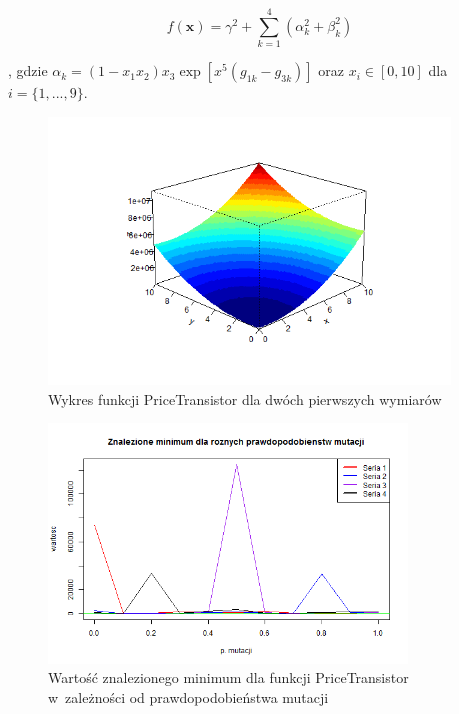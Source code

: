 \documentclass[11pt, a4paper]{article}
\begin{document}
\begin{equation}\label{eq:pricetransistor}
f(\boldsymbol{x}) = \gamma^2 + \sum_{k=1}^{4} ( \alpha_k^2 + \beta_k^2 )
\end{equation}

, gdzie $ \alpha_k = (1-x_1 x_2)x_3 {\exp[ x^5 (g_{1k} - g_{3k})]}$ oraz $ x_i \in [0, 10]$ dla $i = \{1, ..., 9\}$.

\begin{figure}[H]
	\begin{center}
		\includegraphics[width=0.95\textwidth]{./assets/PriceTransistor1.png}
		\caption{Wykres funkcji PriceTransistor dla dwóch pierwszych wymiarów}
		\label{fig:pricetransistor1}
	\end{center}
\end{figure}

\begin{figure}[H]
	\begin{center}
		\includegraphics[width=0.85\textwidth]{./assets/PriceTransistor2.png}
		\caption{Wartość znalezionego minimum dla funkcji PriceTransistor w~zależności od prawdopodobieństwa mutacji}
		\label{fig:pricetransistor2}
	\end{center}
\end{figure}
\end{document}
